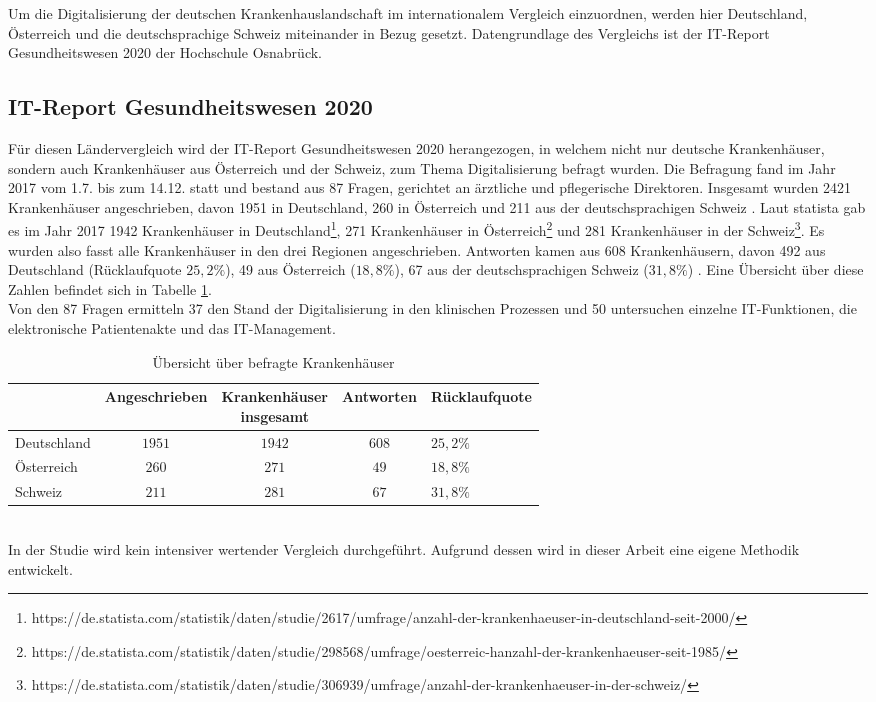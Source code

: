 Um die Digitalisierung der deutschen Krankenhauslandschaft im internationalem Vergleich einzuordnen, werden hier Deutschland, Österreich und die deutschsprachige Schweiz miteinander in Bezug gesetzt. Datengrundlage des Vergleichs ist der IT-Report Gesundheitswesen 2020 der Hochschule Osnabrück.
\subsection{IT-Report Gesundheitswesen 2020}
Für diesen Ländervergleich wird der IT-Report Gesundheitswesen 2020 herangezogen, in welchem nicht nur deutsche Krankenhäuser, sondern auch Krankenhäuser aus Österreich und der Schweiz, zum Thema Digitalisierung befragt wurden. Die Befragung fand im Jahr 2017 vom 1.7. bis zum 14.12. statt und bestand aus 87 Fragen, gerichtet an ärztliche und pflegerische Direktoren. Insgesamt wurden 2421 Krankenhäuser angeschrieben, davon 1951 in Deutschland, 260 in Österreich und 211 aus der deutschsprachigen Schweiz \parencite{huebner2020}. Laut statista gab es im Jahr 2017 1942 Krankenhäuser in Deutschland\footnote{https://de.statista.com/statistik/daten/studie/2617/umfrage/anzahl-der-krankenhaeuser-in-deutschland-seit-2000/}, 271 Krankenhäuser in Österreich\footnote{https://de.statista.com/statistik/daten/studie/298568/umfrage/oesterreic-hanzahl-der-krankenhaeuser-seit-1985/} und 281 Krankenhäuser in der Schweiz\footnote{https://de.statista.com/statistik/daten/studie/306939/umfrage/anzahl-der-krankenhaeuser-in-der-schweiz/}. Es wurden also fasst alle Krankenhäuser in den drei Regionen angeschrieben. Antworten kamen aus 608 Krankenhäusern, davon 492 aus Deutschland (Rücklaufquote $25,2\%$), 49 aus Österreich ($18,8\%$), 67 aus der deutschsprachigen Schweiz ($31,8\%$) . Eine Übersicht über diese Zahlen befindet sich in Tabelle \ref{tab:anzahl-krankenhaeuser}.\\

Von den 87 Fragen ermitteln 37 den Stand der Digitalisierung in den klinischen Prozessen und 50 untersuchen einzelne IT-Funktionen, die elektronische Patientenakte und das IT-Management.\\
\begin{table}[ht]
\begin{center}
	\begin{tabular}{l|c|c|c|l}
		&Angeschrieben&\parbox[c]{13ex}{\centering Krankenhäuser\\ insgesamt}&Antworten&Rücklaufquote\\
		\hline
		Deutschland&$1951$&$1942$&$608$&$25,2\%$\\
		Österreich&$260$&$271$&$49$&$18,8\%$\\
		Schweiz&$211$&$281$&$67$&$31,8\%$\\
	\end{tabular}
\end{center}
\caption{Übersicht über befragte Krankenhäuser}	
\label{tab:anzahl-krankenhaeuser}
\end{table}\\
In der Studie wird kein intensiver wertender Vergleich durchgeführt. Aufgrund dessen wird in dieser Arbeit eine eigene Methodik entwickelt.

